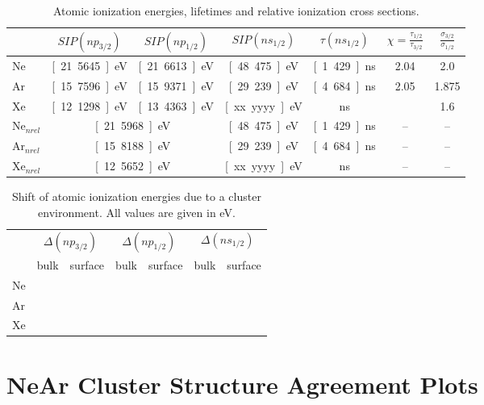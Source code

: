 \begin{appendix}
\begin{table}[h]
 \caption{Atomic ionization energies, lifetimes and relative ionization
          cross sections.}
 \centering
 \begin{tabular}{lcccccc}
  \bottomrule
     & $SIP(np_{3/2})$    & $SIP(np_{1/2})$    & $SIP(ns_{1/2})$    & $\tau(ns_{1/2})$ & $\chi=\frac{\tau_{1/2}}{\tau_{3/2}}$ & $\frac{\sigma_{3/2}}{\sigma_{1/2}}$ \\
  \midrule
   Ne& \unit[21.5645]{eV} & \unit[21.6613]{eV} & \unit[48.475]{eV} & \unit[1.429]{ns} & 2.04 & 2.0 \\
   Ar& \unit[15.7596]{eV} & \unit[15.9371]{eV} & \unit[29.239]{eV} & \unit[4.684]{ns} & 2.05 & 1.875\\
   Xe& \unit[12.1298]{eV} & \unit[13.4363]{eV} & \unit[xx.yyyy]{eV} & \unit[]{ns} &   & 1.6  \\
  \midrule
   Ne$_{nrel}$ & \multicolumn{2}{c}{\unit[21.5968]{eV}} & \unit[48.475]{eV} & \unit[1.429]{ns} & -- & --\\
   Ar$_{nrel}$ & \multicolumn{2}{c}{\unit[15.8188]{eV}} & \unit[29.239]{eV} & \unit[4.684]{ns} & -- & --\\
   Xe$_{nrel}$ & \multicolumn{2}{c}{\unit[12.5652]{eV}} & \unit[xx.yyyy]{eV} & \unit[]{ns} & -- & --  \\
  \bottomrule
 \end{tabular}
 \label{table:noble_atom_properties}
\end{table}

\begin{table}[h]
 \caption{Shift of atomic ionization energies due to a cluster environment.
          All values are given in eV.}
 \centering
 \begin{tabular}{lcccccc}
  \toprule
       & \multicolumn{2}{c}{$\Delta(np_{3/2})$} & \multicolumn{2}{c}{$\Delta(np_{1/2})$} & \multicolumn{2}{c}{$\Delta(ns_{1/2})$} \\
       & bulk    & surface & bulk    & surface & bulk    & surface \\
  \midrule
   Ne  &         &         &         &         &         &         \\
   Ar  &         &         &         &         &         &         \\
   Xe  &         &         &         &         &         &         \\
  \bottomrule
 \end{tabular}
 \label{table:cluster_shifts}
\end{table}







\chapter{NeAr Cluster Structure Agreement Plots}




\end{appendix}
